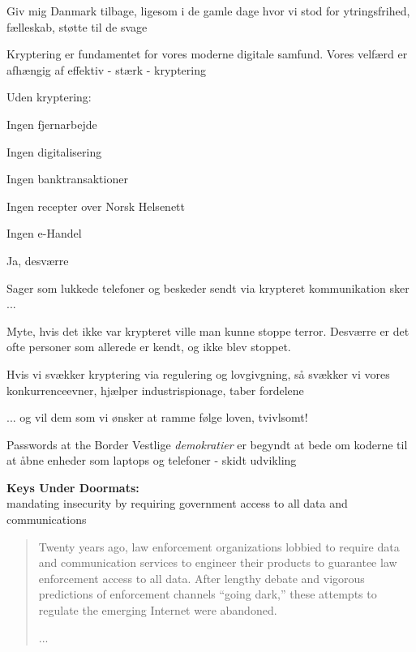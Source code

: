 \documentclass[20pt,landscape,a4paper,footrule]{foils}
\begin{document}
Giv mig Danmark tilbage, ligesom i de gamle dage
hvor vi stod for ytringsfrihed, fælleskab, støtte til de svage



Kryptering er fundamentet for vores moderne digitale samfund. Vores velfærd er afhængig af effektiv - stærk - kryptering

Uden kryptering:
\begin{list2}
\item Ingen fjernarbejde
\item Ingen digitalisering
\item Ingen banktransaktioner
\item Ingen recepter over Norsk Helsenett
\item Ingen e-Handel
\end{list2}


Ja, desværre

Sager som lukkede telefoner og beskeder sendt via krypteret kommunikation sker ...

Myte, hvis det ikke var krypteret ville man kunne stoppe terror. Desværre er det ofte personer som allerede er kendt, og ikke blev stoppet.

Hvis vi svækker kryptering via regulering og lovgivgning, så svækker vi vores konkurrenceevner, hjælper industrispionage, taber fordelene

... og vil dem som vi ønsker at ramme følge loven, tvivlsomt!


Passwords at the Border
Vestlige \emph{demokratier} er begyndt at bede om koderne til at åbne enheder som laptops og telefoner - skidt udvikling

{\bf Keys Under Doormats:}\\
mandating insecurity by requiring government access to all
data and communications

\begin{quote}
Twenty years ago, law enforcement organizations lobbied to require data and
communication services to engineer their products to guarantee law enforcement
access to all data. After lengthy debate and vigorous predictions of enforcement
channels “going dark,” these attempts to regulate the emerging Internet were abandoned.

...
\end{quote}

\end{document}
